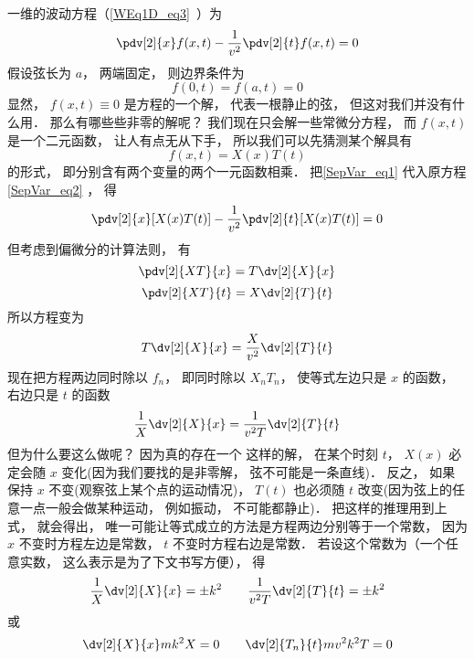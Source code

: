 一维的波动方程（\autoref{WEq1D_eq3}~）为
\begin{equation}
\pdv[2]{x} f(x, t) - \frac{1}{v^2} \pdv[2]{t}f(x, t) = 0
\end{equation}
假设弦长为 $a$， 两端固定， 则边界条件为
\begin{equation}\label{SepVar_eq3}
f(0, t) = f(a, t) = 0
\end{equation}
显然， $f(x, t) \equiv 0$ 是方程的一个解， 代表一根静止的弦， 但这对我们并没有什么用． 那么有哪些些非零的解呢？ 我们现在只会解一些常微分方程， 而 $f(x, t)$ 是一个二元函数， 让人有点无从下手， 所以我们可以先猜测某个解具有
\begin{equation}\label{SepVar_eq1}
f(x, t) = X(x) T(t)
\end{equation}
的形式， 即分别含有两个变量的两个一元函数相乘． 把\autoref{SepVar_eq1} 代入原方程\autoref{SepVar_eq2} ， 得
\begin{equation}
\pdv[2]{x}[X(x)T(t)] - \frac{1}{v^2}\pdv[2]{t} [X(x) T(t)] = 0
\end{equation}
但考虑到偏微分的计算法则， 有
\begin{equation}
\pdv[2]{XT}{x} = T \dv[2]{X}{x}
\end{equation}
\begin{equation}
\pdv[2]{XT}{t} = X \dv[2]{T}{t}
\end{equation}
所以方程变为
\begin{equation}
T\dv[2]{X}{x} = \frac{X}{v^2} \dv[2]{T}{t}
\end{equation}
现在把方程两边同时除以 $f_n$， 即同时除以 $X_n T_n$， 使等式左边只是 $x$ 的函数， 右边只是 $t$ 的函数
\begin{equation}
\frac{1}{X}\dv[2]{X}{x} = \frac{1}{v^2 T} \dv[2]{T}{t}
\end{equation}
但为什么要这么做呢？ 因为真的存在一个 这样的解， 在某个时刻 $t$， $X(x)$ 必定会随 $x$ 变化(因为我们要找的是非零解， 弦不可能是一条直线)． 反之， 如果保持 $x$ 不变(观察弦上某个点的运动情况)， $T(t)$ 也必须随 $t$ 改变(因为弦上的任意一点一般会做某种运动， 例如振动， 不可能都静止)． 把这样的推理用到上式， 就会得出， 唯一可能让等式成立的方法是方程两边分别等于一个常数， 因为 $x$ 不变时方程左边是常数，  $t$ 不变时方程右边是常数． 若设这个常数为（一个任意实数， 这么表示是为了下文书写方便）， 得
\begin{equation}
\frac{1}{X}\dv[2]{X}{x} = \pm k^2
\qquad
\frac{1}{v^2 T}\dv[2]{T}{t} = \pm k^2
\end{equation}
或
\begin{equation}
\dv[2]{X}{x} mk^2 X = 0
\qquad
\dv[2]{T_n}{t} mv^2k^2 T = 0
\end{equation}
